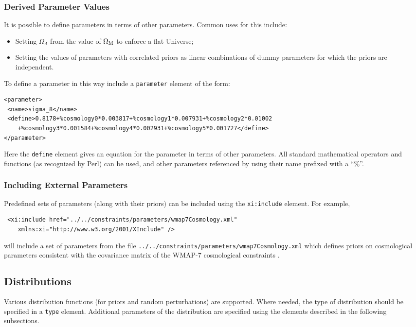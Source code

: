 \subsubsection{Derived Parameter Values}

It is possible to define parameters in terms of other parameters. Common uses for this include:
\begin{itemize}
 \item Setting $\Omega_\Lambda$ from the value of $\Omega_{\rm M}$ to enforce a flat Universe;
 \item Setting the values of parameters with correlated priors as linear combinations of dummy parameters for which the priors are independent.
\end{itemize}
To define a parameter in this way include a {\tt parameter} element of the form:
\begin{verbatim}
<parameter>
 <name>sigma_8</name>
 <define>0.8178+%cosmology0*0.003817+%cosmology1*0.007931+%cosmology2*0.01002
    +%cosmology3*0.001584+%cosmology4*0.002931+%cosmology5*0.001727</define>
</parameter>
\end{verbatim}
Here the {\tt define} element gives an equation for the parameter in terms of other parameters. All standard mathematical operators and functions (as recognized by Perl) can be used, and other parameters referenced by using their name prefixed with a ``\%''.

\subsubsection{Including External Parameters}

Predefined sets of parameters (along with their priors) can be included using the {\tt xi:include} element. For example,
\begin{verbatim}
 <xi:include href="../../constraints/parameters/wmap7Cosmology.xml"
    xmlns:xi="http://www.w3.org/2001/XInclude" />
\end{verbatim}
will include a set of parameters from the file {\tt ../../constraints/parameters/wmap7Cosmology.xml} which defines priors on cosmological parameters consistent with the covariance matrix of the WMAP-7 cosmological constraints \citep{komatsu_seven-year_2010}.

\subsection{Distributions}

Various distribution functions (for priors and random perturbations) are supported. Where needed, the type of distribution should be specified in a {\tt type} element. Additional parameters of the distribution are specified using the elements described in the following subsections.

